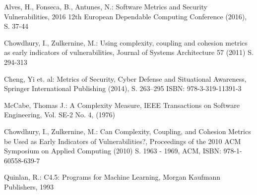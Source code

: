 
\begin{thebibliography}{8}
Alves, H., Fonseca, B., Antunes, N.: Software Metrics and Security Vulnerabilities, 2016 12th European Dependable Computing Conference (2016), S. 37-44

Chowdhury, I., Zulkernine, M.: Using complexity, coupling and cohesion metrics as early indicators of vulnerabilities, Journal of Systems Architecture 57 (2011) S. 294-313

Cheng, Yi et. al: Metrics of Security, Cyber Defense and Situational Awareness, Springer International Publishing (2014), S. 263--295
ISBN: 978-3-319-11391-3

McCabe, Thomas J.: A Complexity Measure, IEEE Transactions on Software Engineering, Vol. SE-2 No. 4, (1976)

Chowdhury, I., Zulkernine, M.: Can Complexity, Coupling, and Cohesion Metrics be Used as Early Indicators of Vulnerabilities?, Proceedings of the 2010 ACM Symposium on Applied Computing (2010) S. 1963 - 1969, ACM, ISBN: 978-1-60558-639-7

Quinlan, R.: C4.5: Programs for Machine Learning, Morgan Kaufmann Publishers, 1993

\end{thebibliography}
